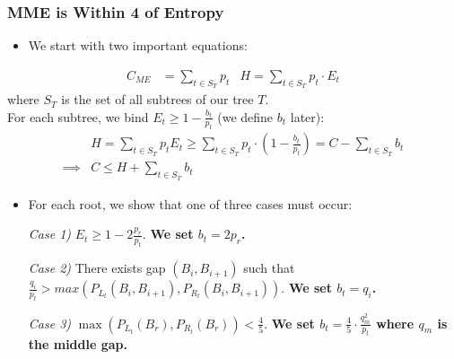 \documentclass{beamer}
\theoremstyle{plain}
\begin{document}
\begin{frame} \frametitle{MME is Within 4 of Entropy}

\begin{itemize}
\item We start with two important equations:
\end{itemize}
\begin{align*}
C_{ME} &= \sum_{t \in S_T} p_t
 &H = \sum_{t \in S_T} p_t \cdot E_t
\end{align*}  
where $S_T$ is the set of all subtrees of our tree $T$. \\

\noindent For each subtree, we bind $E_t \geq 1 - \frac{b_t}{p_t}$ (we define $b_t$ later): 
\begin{align*}
&H = \sum_{t \in S_T} p_t E_t \geq \sum_{t \in S_T} p_t \cdot (1 - \frac{b_t}{p_t}) = C - \sum_{t \in S_T} b_t \\
 \implies &C \leq H + \sum_{t \in S_T} b_t
\end{align*}

\end{frame}

\begin{frame}

\begin{itemize}
\item For each root, we show that one of three cases must occur:

\item[\textit{Case 1)}] $E_t \geq 1-2 \frac{p_r}{p_t}$. \textbf{We set $b_t = 2p_r$.}

\item[\textit{Case 2)}] There exists gap $(B_i, B_{i+1})$ such that $\frac{q_i}{p_t} > max(P_{L_t}(B_i, B_{i+1}), P_{R_t}(B_i, B_{i+1}))$. \textbf{We set $b_t = q_i$.}

\item[\textit{Case 3)}]  $\max(P_{L_t}(B_r), P_{R_t}(B_r)) < \frac{4}{5}$. \textbf{We set $b_t = \frac{4}{5} \cdot \frac{q_m^2}{p_t}$ where $q_m$ is the middle gap.}

\end{itemize}


\end{frame}
\end{document}
